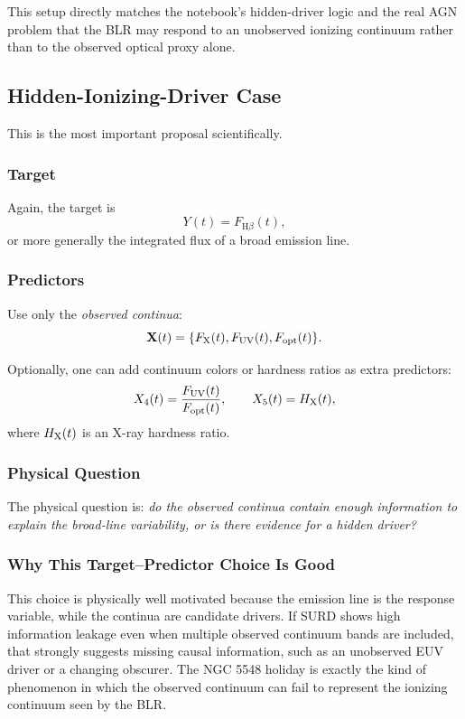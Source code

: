 \documentclass{article}
\begin{document}
This setup directly matches the notebook's hidden-driver logic and the real AGN problem that the BLR may respond to an unobserved ionizing continuum rather than to the observed optical proxy alone.

\subsection{Hidden-Ionizing-Driver Case}

This is the most important proposal scientifically.

\subsubsection{Target}

Again, the target is
\[
Y(t)=F_{\mathrm{H}\beta}(t),
\]
or more generally the integrated flux of a broad emission line.

\subsubsection{Predictors}

Use only the \emph{observed continua}:
\[
\mathbf{X}(t)=\{F_{\rm X}(t),F_{\rm UV}(t),F_{\rm opt}(t)\}.
\]

Optionally, one can add continuum colors or hardness ratios as extra predictors:
\[
X_4(t)=\frac{F_{\rm UV}(t)}{F_{\rm opt}(t)}, \qquad
X_5(t)=H_{\rm X}(t),
\]
where \(H_{\rm X}(t)\) is an X-ray hardness ratio.

\subsubsection{Physical Question}

The physical question is: \emph{do the observed continua contain enough information to explain the broad-line variability, or is there evidence for a hidden driver?}

\subsubsection{Why This Target--Predictor Choice Is Good}

This choice is physically well motivated because the emission line is the response variable, while the continua are candidate drivers. If SURD shows high information leakage even when multiple observed continuum bands are included, that strongly suggests missing causal information, such as an unobserved EUV driver or a changing obscurer. The NGC 5548 holiday is exactly the kind of phenomenon in which the observed continuum can fail to represent the ionizing continuum seen by the BLR.
\end{document}
